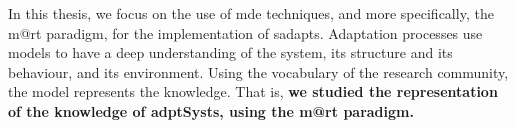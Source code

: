 \bigskip

In this thesis, we focus on the use of \gls{mde} techniques, and more specifically, the \gls{m@rt} paradigm, for the implementation of \glspl{sadapt}.
Adaptation processes use \glspl{model} to have a deep understanding of the system, its structure and its behaviour, and its environment.
Using the vocabulary of the research community, the \gls{model} represents the \gls{knowledge}. 
That is, \textbf{we studied the representation of the \gls{knowledge} of \glspl{adptSyst}, using the \gls{m@rt} paradigm.}








